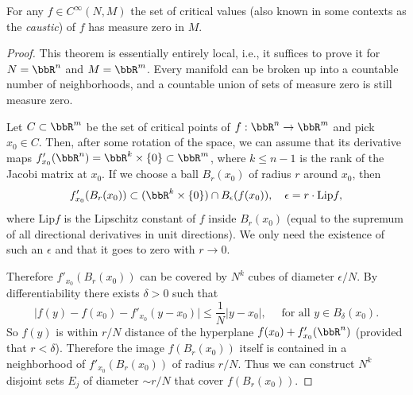 \begin{thm}[Sard]\label{thm sard}
    For any $f\in C^\infty(N,M)$ the set of critical values (also known in some contexts as the \emph{caustic}) of $f$ has measure zero in $M$.
\end{thm}
\begin{proof}
    This theorem is essentially entirely local, i.e., it suffices to prove it for $N=\bbR^n$ and $M=\bbR^m$. Every manifold can be broken up into a countable number of neighborhoods, and a countable union of sets of measure zero is still measure zero.

    Let $C\subset \bbR^m$ be the set of critical points of $f:\bbR^n\to \bbR^m$ and pick $x_0\in C$. Then, after some rotation of the space, we can assume that its derivative maps $f'_{x_0}(\bbR^n)=\bbR^k\times \{0\}\subset \bbR^m$, where $k\leq n-1$ is the rank of the Jacobi matrix at $x_0$.  If we choose a ball $B_r(x_0)$ of radius $r$ around $x_0$, then
    \[f'_{x_0}(B_r(x_0))\subset (\bbR^k\times \{0\})\cap B_\epsilon(f(x_0)),\quad \epsilon=r\cdot \mathrm{Lip}f,\]
    where $\mathrm{Lip}f$ is the Lipschitz constant of $f$ inside $B_r(x_0)$ (equal to the supremum of all directional derivatives in unit directions). We only need the existence of such an $\epsilon$ and that it goes to zero with $r\to 0$.

    Therefore $f'_{x_0}(B_r(x_0))$ can be covered by $N^k$ cubes of diameter $\epsilon/N$. By differentiability there exists $\delta>0$ such that 
    \[\lvert f(y)-f(x_0)-f'_{x_0}(y-x_0)\rvert\leq \frac{1}{N}|y-x_0|,\quad \text{ for all }y\in B_\delta(x_0).\]
    So $f(y)$ is within $r/N$ distance of the hyperplane $f(x_0)+f'_{x_0}(\bbR^n)$ (provided that $r<\delta$). Therefore the image $f(B_r(x_0))$ itself is contained in a neighborhood of $f'_{x_0}(B_r(x_0))$ of radius $r/N$. Thus we can construct $N^k$ disjoint sets $E_j$ of diameter $\sim r/N$ that cover $f(B_r(x_0))$.


\end{proof}

